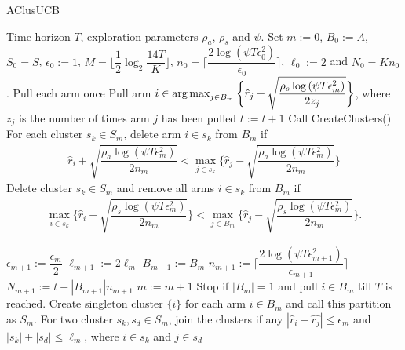 \begin{algorithm}[th!]
\caption{AClusUCB}
\label{alg:aclusucb}
\begin{algorithmic}
 Time horizon $T$, exploration parameters $\rho_a$, $\rho_s$ and $\psi$.
 Set $m:=0$, $B_{0}:=A$, $S_0 = S$, $\epsilon_{0}:=1$, $M=\big \lfloor \dfrac{1}{2}\log_{2} \dfrac{14T}{K}\big\rfloor$, $n_{0}=\bigg\lceil\dfrac{2\log{(\psi T\epsilon_{0}^{2})}}{\epsilon_{0}}\bigg\rceil$, $\ell_{0}:=2$ and  $N_{0}=Kn_{0}$.
\State Pull each arm once
\State Pull arm $i\in\operatorname*{arg\,max}_{j\in B_{m}}\bigg\lbrace \hat{r}_{j} + \sqrt{\dfrac{\rho_{s}\log{(\psi T\epsilon_{m}^{2})}}{2 z_{j}}} \bigg\rbrace$, where $z_j$ is the number of times arm $j$ has been pulled
\State $t:=t+1$
\State Call CreateClusters()
\ArmElim
\State For each cluster $s_k \in S_{m}$, delete arm ${i}\in s_{k}$ from $B_{m}$ if
\begin{align*}
\hat{r}_{i} + \sqrt{\dfrac{\rho_{a}\log{(\psi T\epsilon_{m}^{2})}}{2 n_{m}}}  < \max_{{j}\in s_{k}}\bigg\lbrace\hat{r}_{j} -\sqrt{\dfrac{\rho_{a}\log{(\psi T\epsilon_{m}^{2})}}{2 n_{m}}} \bigg\rbrace
\end{align*}
\EndArmElim
\ClusElim
\State Delete cluster $s_{k}\in S_{m}$ and remove all arms $i\in s_{k}$ from $B_{m}$ if 
\begin{align*}
 \max_{{i}\in s_{k}}\bigg\lbrace\hat{r}_{i} + \sqrt{\dfrac{\rho_{s}\log{(\psi T\epsilon_{m}^{2})}}{2 n_{m}}}\bigg\rbrace 
 < \max_{{j}\in B_{m}} \bigg\lbrace\hat{r}_{j} - \sqrt{\dfrac{\rho_{s} \log{(\psi T\epsilon_{m}^{2})}}{2 n_{m}}}\bigg\rbrace.
\end{align*}
\EndClusElim

\State $\epsilon_{m+1}:=\dfrac{\epsilon_{m}}{2}$\vspace{0.5ex}
\State $\ell_{m+1}:=2\ell_{m}$
\State $B_{m+1}:=B_{m}$
\State $n_{m+1}:=\bigg\lceil\dfrac{2\log{(\psi T\epsilon_{m+1}^{2})}}{\epsilon_{m+1}}\bigg\rceil$
\State $N_{m+1}:=t+|B_{m+1}| n_{m+1}$
\State $m:=m+1$
\State Stop if $|B_{m}|=1$ and pull ${i}\in B_{m}$ till $T$ is reached.
\EndIf
\EndFor
{}
\State Create singleton cluster $\lbrace i\rbrace$ for each arm $i\in B_{m}$ and call this partition as $S_{m}$.
\State For two cluster $s_{k},s_{d}\in S_{m}$, join the clusters if any $|\hat{r}_{i}-\hat{r_{j}}| \leq \epsilon_{m}$ and $|s_{k}|+|s_{d}|\leq \ell_{m}$, where $i\in s_{k}$ and $j\in s_{d}$ 
\EndProcedure
\end{algorithmic}
\end{algorithm}


